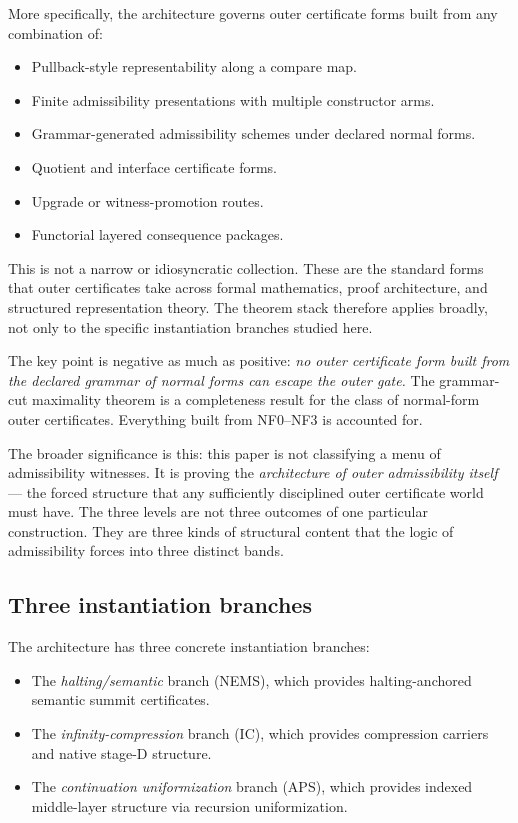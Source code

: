 \documentclass[11pt]{article}
\theoremstyle{plain}
\theoremstyle{definition}
\theoremstyle{remark}
\begin{document}
More specifically, the architecture governs outer certificate forms built
from any combination of:
\begin{itemize}
  \item Pullback-style representability along a compare map.
  \item Finite admissibility presentations with multiple constructor arms.
  \item Grammar-generated admissibility schemes under declared normal forms.
  \item Quotient and interface certificate forms.
  \item Upgrade or witness-promotion routes.
  \item Functorial layered consequence packages.
\end{itemize}

This is not a narrow or idiosyncratic collection.  These are the standard
forms that outer certificates take across formal mathematics, proof
architecture, and structured representation theory.  The theorem stack
therefore applies broadly, not only to the specific instantiation branches
studied here.

The key point is negative as much as positive: \emph{no outer certificate
form built from the declared grammar of normal forms can escape the outer
gate.}  The grammar-cut maximality theorem is a completeness result for
the class of normal-form outer certificates.  Everything built from
NF0--NF3 is accounted for.

The broader significance is this: this paper is not classifying a menu
of admissibility witnesses.  It is proving the \emph{architecture of
outer admissibility itself} --- the forced structure that any sufficiently
disciplined outer certificate world must have.  The three levels are not
three outcomes of one particular construction.  They are three kinds of
structural content that the logic of admissibility forces into three
distinct bands.

\subsection{Three instantiation branches}

The architecture has three concrete instantiation branches:
\begin{itemize}
  \item The \emph{halting/semantic} branch (NEMS), which provides
    halting-anchored semantic summit certificates.
  \item The \emph{infinity-compression} branch (IC), which provides
    compression carriers and native stage-D structure.
  \item The \emph{continuation uniformization} branch (APS), which
    provides indexed middle-layer structure via recursion uniformization.
\end{itemize}
\end{document}
